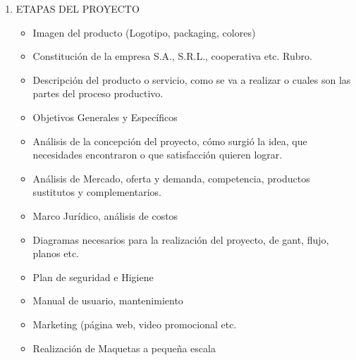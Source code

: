 \documentclass[planificacion2024.tex]{subfiles}
\begin{document}
\begin{enumerate}
    \item ETAPAS DEL PROYECTO
    \begin{itemize}
        \item Imagen del producto (Logotipo, packaging,
colores)
\item Constitución de la empresa S.A., S.R.L.,
cooperativa etc. Rubro.
\item Descripción del producto o servicio, como se va
a realizar o cuales son las partes del proceso productivo.
\item Objetivos Generales y Específicos
\item Análisis de la concepción del proyecto, cómo
surgió la idea, que necesidades encontraron o
que satisfacción quieren lograr.
\item Análisis de Mercado, oferta y demanda,
competencia, productos sustitutos y
complementarios.
\item Marco Jurídico, análisis de costos
\item Diagramas necesarios para la realización del
proyecto, de gant, flujo, planos etc.
\item Plan de seguridad e Higiene
\item Manual de usuario, mantenimiento
\item Marketing (página web, video promocional etc.
\item Realización de Maquetas a pequeña escala
    \end{itemize}
\end{enumerate}
  
\end{document}
